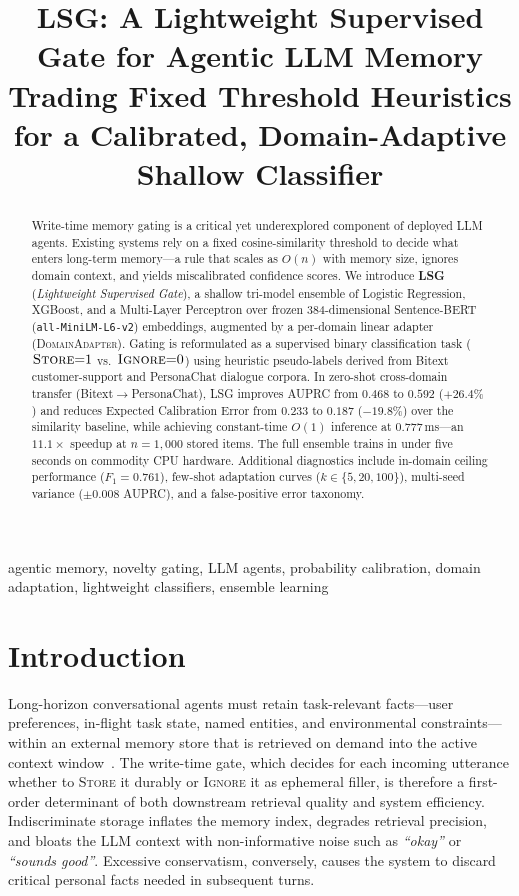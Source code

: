 \documentclass[conference]{IEEEtran}
\title{LSG: A Lightweight Supervised Gate for Agentic LLM Memory\\
{\large Trading Fixed Threshold Heuristics for a Calibrated,
  Domain-Adaptive Shallow Classifier}}
\author{
  \IEEEauthorblockN{Shlok Chorge}
  \IEEEauthorblockA{
    Department of Information Technology\\
    Vidyalankar Polytechnic and Padmabhushan Vasantdada\\
    Patil College of Engineering (VPPCOE)\\
    University of Mumbai, Mumbai, India\\
    \texttt{shlokchorge2929@gmail.com}
  }
  \and
  \IEEEauthorblockN{Prithibe Majumder}
  \IEEEauthorblockA{\texttt{majumderprithibe@gmail.com}}
}
\begin{document}
\maketitle

\begin{abstract}
Write-time memory gating is a critical yet underexplored
component of deployed LLM agents.
Existing systems rely on a fixed cosine-similarity threshold
to decide what enters long-term memory---a rule that scales
as $O(n)$ with memory size, ignores domain context, and
yields miscalibrated confidence scores.
We introduce \textbf{LSG} (\emph{Lightweight Supervised Gate}),
a shallow tri-model ensemble of Logistic Regression, XGBoost,
and a Multi-Layer Perceptron over frozen 384-dimensional
Sentence-BERT (\texttt{all-MiniLM-L6-v2}) embeddings,
augmented by a per-domain linear adapter
(\textsc{DomainAdapter}).
Gating is reformulated as a supervised binary classification
task ($\textsc{Store}{=}1$ vs.\ $\textsc{Ignore}{=}0$) using
heuristic pseudo-labels derived from Bitext customer-support
and PersonaChat dialogue corpora.
In zero-shot cross-domain transfer (Bitext$\to$PersonaChat),
LSG improves AUPRC from $0.468$ to $0.592$ ($+26.4\%$) and
reduces Expected Calibration Error from $0.233$ to $0.187$
($-19.8\%$) over the similarity baseline, while achieving
constant-time $O(1)$ inference at $0.777$\,ms---an
$11.1{\times}$ speedup at $n{=}1{,}000$ stored items.
The full ensemble trains in under five seconds on commodity
CPU hardware.
Additional diagnostics include in-domain ceiling performance
($F_1{=}0.761$), few-shot adaptation curves
($k\in\{5,20,100\}$), multi-seed variance ($\pm0.008$ AUPRC),
and a false-positive error taxonomy.
\end{abstract}

\begin{IEEEkeywords}
agentic memory, novelty gating, LLM agents, probability
calibration, domain adaptation, lightweight classifiers,
ensemble learning
\end{IEEEkeywords}

\section{Introduction}

Long-horizon conversational agents must retain task-relevant
facts---user preferences, in-flight task state, named
entities, and environmental constraints---within an external
memory store that is retrieved on demand into the active
context window~\cite{packer2023memgpt,mem0_2025,xu2025amem}.
The write-time gate, which decides for each incoming utterance
whether to \textsc{Store} it durably or \textsc{Ignore} it as
ephemeral filler, is therefore a first-order determinant of
both downstream retrieval quality and system efficiency.
Indiscriminate storage inflates the memory index, degrades
retrieval precision, and bloats the LLM context with
non-informative noise such as \emph{``okay''} or
\emph{``sounds good''}.
Excessive conservatism, conversely, causes the system to
discard critical personal facts needed in subsequent turns.
\end{document}
